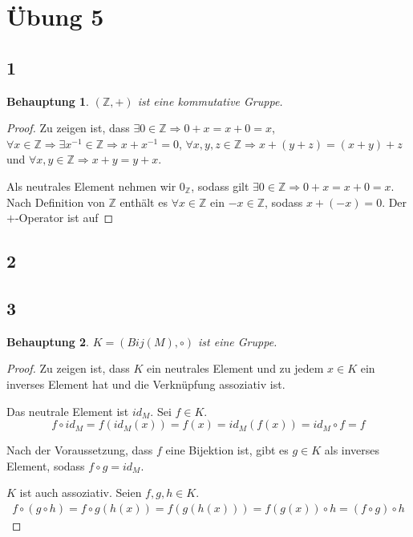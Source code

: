 \documentclass[a4paper,10pt]{article}
\newtheorem*{claim}{Behauptung}
\begin{document}
\section*{Übung 5}

\subsection*{1}

\begin{claim}
 $(\mathbb{Z}, +)$ ist eine kommutative Gruppe.
\end{claim}

\begin{proof}
 Zu zeigen ist, dass $\exists 0 \in \mathbb{Z} \Rightarrow 0 + x = x + 0 = x$, $\forall x \in \mathbb{Z} \Rightarrow \exists x^{-1} \in \mathbb{Z} \Rightarrow x + x^{-1} = 0$, $\forall x, y, z \in \mathbb{Z} \Rightarrow x + (y + z) = (x + y) + z$ und $\forall x, y \in \mathbb{Z} \Rightarrow x + y = y + x$.
 
 Als neutrales Element nehmen wir $0_{\mathbb{Z}}$, sodass gilt $\exists 0 \in \mathbb{Z} \Rightarrow 0 + x = x + 0 = x$.
 Nach Definition von $\mathbb{Z}$ enthält es $\forall x \in \mathbb{Z}$ ein $-x \in \mathbb{Z}$, sodass $x + (-x) = 0$.
 Der $+$-Operator ist auf 
\end{proof}

\subsection*{2}

\subsection*{3}

\begin{claim}
 $K = (Bij(M), \circ)$ ist eine Gruppe.
\end{claim}

\begin{proof}
 Zu zeigen ist, dass $K$ ein neutrales Element und zu jedem $x \in K$ ein inverses Element hat und die Verknüpfung assoziativ ist.
 
 Das neutrale Element ist $id_M$.
 Sei $f \in K$.
 \begin{equation*}
  f \circ id_M = f(id_M(x)) = f(x) = id_M(f(x)) = id_M \circ f = f
 \end{equation*}

 Nach der Voraussetzung, dass $f$ eine Bijektion ist, gibt es $g \in K$ als inverses Element, sodass $f \circ g = id_M$.
 
 $K$ ist auch assoziativ.
 Seien $f, g, h \in K$.
 \begin{align*}
  f \circ (g \circ h) = f \circ g(h(x)) = f(g(h(x))) = f(g(x)) \circ h = (f \circ g) \circ h
 \end{align*}
\end{proof}
\end{document}
